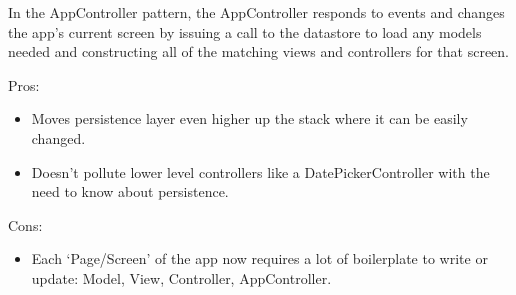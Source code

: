 In the AppController pattern, the AppController responds to events and changes the app's current screen by issuing a call to the datastore to load any models needed and constructing all of the matching views and controllers for that screen.

Pros:
\begin{itemize}
  \item Moves persistence layer even higher up the stack where it can be easily changed.
  \item Doesn't pollute lower level controllers like a DatePickerController with the need to know about persistence.
\end{itemize}

Cons:
\begin{itemize}
  \item Each `Page/Screen' of the app now requires a lot of boilerplate to write or update: Model, View, Controller, AppController.
\end{itemize}
